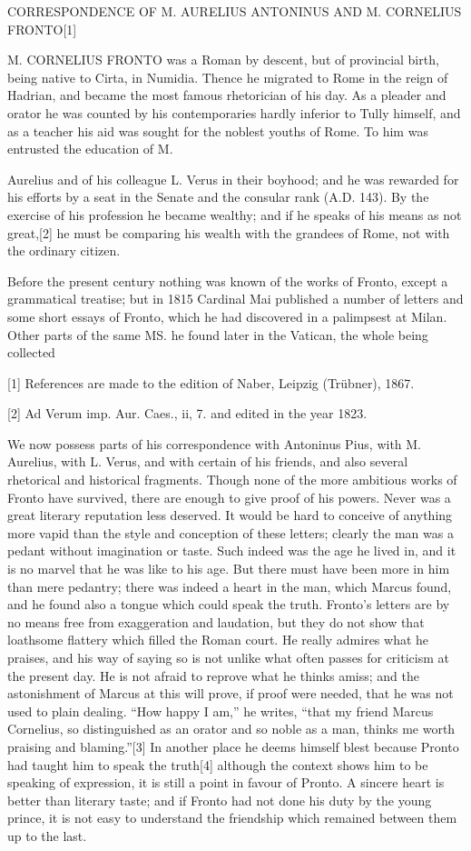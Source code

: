 CORRESPONDENCE OF M. AURELIUS ANTONINUS AND M. CORNELIUS FRONTO[1]

M. CORNELIUS FRONTO was a Roman by descent, but of provincial birth,
being native to Cirta, in Numidia. Thence he migrated to Rome in the reign
of Hadrian, and became the most famous rhetorician of his day. As a
pleader and orator he was counted by his contemporaries hardly inferior to
Tully himself, and as a teacher his aid was sought for the noblest youths
of Rome. To him was entrusted the education of M.

Aurelius and of his colleague L. Verus in their boyhood; and he was
rewarded for his efforts by a seat in the Senate and the consular rank
(A.D. 143). By the exercise of his profession he became wealthy; and if he
speaks of his means as not great,[2]
he must be comparing his wealth with the grandees of Rome, not with the
ordinary citizen.

Before the present century nothing was known of the works of Fronto,
except a grammatical treatise; but in 1815 Cardinal Mai published a number
of letters and some short essays of Fronto, which he had discovered in a
palimpsest at Milan. Other parts of the same MS. he found later in the
Vatican, the whole being collected

[1]
References are made to the edition of Naber, Leipzig (Trübner), 1867.

[2]
Ad Verum imp. Aur. Caes., ii, 7. and edited in the year 1823.

We now possess parts of his correspondence with Antoninus Pius, with M.
Aurelius, with L. Verus, and with certain of his friends, and also several
rhetorical and historical fragments. Though none of the more ambitious
works of Fronto have survived, there are enough to give proof of his
powers. Never was a great literary reputation less deserved. It would be
hard to conceive of anything more vapid than the style and conception of
these letters; clearly the man was a pedant without imagination or taste.
Such indeed was the age he lived in, and it is no marvel that he was like
to his age. But there must have been more in him than mere pedantry; there
was indeed a heart in the man, which Marcus found, and he found also a
tongue which could speak the truth. Fronto's letters are by no means free
from exaggeration and laudation, but they do not show that loathsome
flattery which filled the Roman court. He really admires what he praises,
and his way of saying so is not unlike what often passes for criticism at
the present day. He is not afraid to reprove what he thinks amiss; and the
astonishment of Marcus at this will prove, if proof were needed, that he
was not used to plain dealing. ``How happy I am,'' he writes, ``that my
friend Marcus Cornelius, so distinguished as an orator and so noble as a
man, thinks me worth praising and blaming.''[3]
In another place he deems himself blest because Pronto had taught him to
speak the truth[4]
although the context shows him to be speaking of expression, it is still
a point in favour of Pronto. A sincere heart is better than literary
taste; and if Fronto had not done his duty by the young prince, it is not
easy to understand the friendship which remained between them up to the
last.


